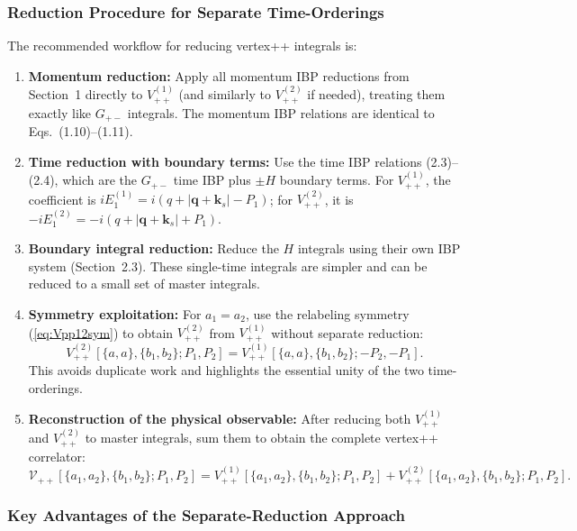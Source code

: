 \documentclass[a4paper,12pt]{article}
\begin{document}
\subsubsection{Reduction Procedure for Separate Time-Orderings}

The recommended workflow for reducing vertex++ integrals is:

\begin{enumerate}
	\item \textbf{Momentum reduction:} Apply all momentum IBP reductions from Section~1 directly to $V_{++}^{(1)}$ (and similarly to $V_{++}^{(2)}$ if needed), treating them exactly like $G_{+-}$ integrals. The momentum IBP relations are identical to Eqs.~(1.10)--(1.11).

	\item \textbf{Time reduction with boundary terms:} Use the time IBP relations (2.3)--(2.4), which are the $G_{+-}$ time IBP plus $\pm H$ boundary terms. For $V_{++}^{(1)}$, the coefficient is $iE_1^{(1)} = i(q+|\bm q+\bm k_s|-P_1)$; for $V_{++}^{(2)}$, it is $-iE_1^{(2)} = -i(q+|\bm q+\bm k_s|+P_1)$.

	\item \textbf{Boundary integral reduction:} Reduce the $H$ integrals using their own IBP system (Section~2.3). These single-time integrals are simpler and can be reduced to a small set of master integrals.

	\item \textbf{Symmetry exploitation:} For $a_1=a_2$, use the relabeling symmetry (\ref{eq:Vpp12sym}) to obtain $V_{++}^{(2)}$ from $V_{++}^{(1)}$ without separate reduction:
	      \[
		      V_{++}^{(2)}[\{a,a\},\{b_1,b_2\}; P_1, P_2] = V_{++}^{(1)}[\{a,a\},\{b_1,b_2\}; -P_2, -P_1].
	      \]
	      This avoids duplicate work and highlights the essential unity of the two time-orderings.

	\item \textbf{Reconstruction of the physical observable:} After reducing both $V_{++}^{(1)}$ and $V_{++}^{(2)}$ to master integrals, sum them to obtain the complete vertex++ correlator:
	      \[
		      \mathcal{V}_{++}[\{a_1,a_2\},\{b_1,b_2\}; P_1, P_2] = V_{++}^{(1)}[\{a_1,a_2\},\{b_1,b_2\}; P_1, P_2] + V_{++}^{(2)}[\{a_1,a_2\},\{b_1,b_2\}; P_1, P_2].
	      \]
\end{enumerate}

\subsubsection{Key Advantages of the Separate-Reduction Approach}
\end{document}
